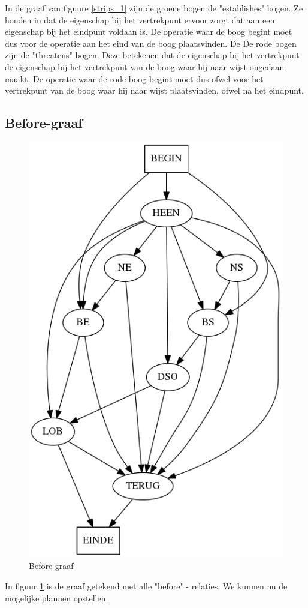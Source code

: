 \documentclass[alternative-exam.tex]{subfiles}
\begin{document}
In de graaf van figuure \ref{strips_1} zijn de groene bogen de "establishes" bogen. Ze houden in dat de eigenschap bij het vertrekpunt ervoor zorgt dat aan een eigenschap bij het eindpunt voldaan is. De operatie waar de boog begint moet dus voor de operatie aan het eind van de boog plaatsvinden.
De De rode bogen zijn de "threatens" bogen. Deze betekenen dat de eigenschap bij het vertrekpunt de eigenschap bij het vertrekpunt van de boog waar hij naar wijst ongedaan maakt. De operatie waar de rode boog begint moet dus ofwel voor het vertrekpunt van de boog waar hij naar wijst plaatsvinden, ofwel na het eindpunt.
\subsection{Before-graaf}
\begin{figure}[H]
\centering
\caption{Before-graaf}
\label{strips_2}
\includegraphics[scale=0.3]{resources/graphs/strips_2.png}
\end{figure}
In figuur \ref{strips_2} is de graaf getekend met alle "before"
- relaties. We kunnen nu de mogelijke plannen opstellen. 
\end{document}
